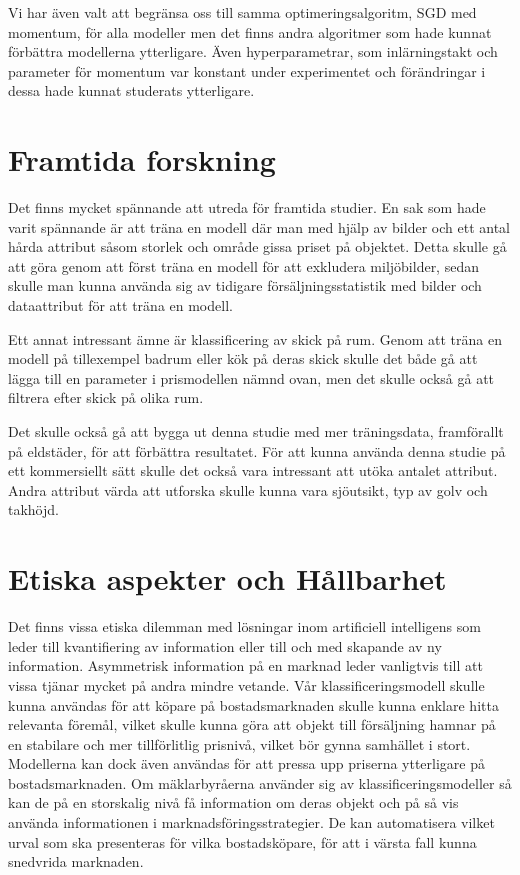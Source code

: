 \documentclass[]{kththesis}
\begin{document}
Vi har även valt att begränsa oss till samma optimeringsalgoritm, SGD med momentum, för alla modeller men det finns andra algoritmer som hade kunnat förbättra modellerna ytterligare. Även hyperparametrar, som inlärningstakt och parameter för momentum var konstant under experimentet och förändringar i dessa hade kunnat studerats ytterligare.


\section{Framtida forskning}

Det finns mycket spännande att utreda för framtida studier.
En sak som hade varit spännande är att träna en modell där man med hjälp av bilder och ett antal hårda attribut såsom storlek och område gissa priset på objektet.
Detta skulle gå att göra genom att först träna en modell för att exkludera miljöbilder, sedan skulle man kunna använda sig av tidigare försäljningsstatistik med bilder och dataattribut för att träna en modell.

Ett annat intressant ämne är klassificering av skick på rum. 
Genom att träna en modell på tillexempel badrum eller kök på deras skick skulle det både gå att lägga till en parameter i prismodellen nämnd ovan, men det skulle också gå att filtrera efter skick på olika rum.

Det skulle också gå att bygga ut denna studie med mer träningsdata, framförallt på eldstäder, för att förbättra resultatet.
För att kunna använda denna studie på ett kommersiellt sätt skulle det också vara intressant att utöka antalet attribut. 
Andra attribut värda att utforska skulle kunna vara sjöutsikt, typ av golv och takhöjd.

\section{Etiska aspekter och Hållbarhet}
Det finns vissa etiska dilemman med lösningar inom artificiell intelligens som leder till kvantifiering av information eller till och med skapande av ny information. Asymmetrisk information på en marknad leder vanligtvis till att vissa tjänar mycket på andra mindre vetande. Vår klassificeringsmodell skulle kunna användas för att köpare på bostadsmarknaden skulle kunna enklare hitta relevanta föremål, vilket skulle kunna göra att objekt till försäljning hamnar på en stabilare och mer tillförlitlig prisnivå, vilket bör gynna samhället i stort. Modellerna kan dock även användas för att pressa upp priserna ytterligare på bostadsmarknaden. Om mäklarbyråerna använder sig av klassificeringsmodeller så kan de på en storskalig nivå få information om deras objekt och på så vis använda informationen i marknadsföringsstrategier. De kan automatisera vilket urval som ska presenteras för vilka bostadsköpare, för att i värsta fall kunna snedvrida marknaden.
\end{document}

